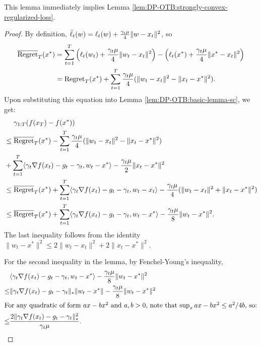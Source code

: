 This lemma immediately implies Lemma \ref{lem:DP-OTB:strongly-convex-regularized-loss}.

\LemDpotbSC*

\begin{proof}
By definition, $\bar{\ell}_t(w)=\ell_t(w) + \frac{\gamma_t\mu}{4}\|w-x_t\|^2$, so
\begin{align*}
    \overline {\mathrm{Regret}}_T(x^*) 
    &= \sum_{t=1}^T \left( \ell_t(w_t)+\frac{\gamma_t\mu}{4}\|w_t-x_t\|^2\right) - \left( \ell_t(x^*) + \frac{\gamma_t\mu}{4}\|x^*-x_t\|^2 \right) \\
    &= \mathrm{Regret}_T(x^*) + \sum_{t=1}^T \frac{\gamma_t\mu}{4}(\|w_t-x_t\|^2-\|x_t-x^*\|^2).
\end{align*}
Upon substituting this equation into Lemma \ref{lem:DP-OTB:basic-lemma-sc}, we get:
\begin{align*}
    &\quad \ \gamma_{1:T}(f(x_T) - f(x^*)) \\
    &\leq \overline{\mathrm{Regret}}_T(x^*) -\sum_{t=1}^T \frac{\gamma_t\mu}{4}(\|w_t-x_t\|^2-\|x_t-x^*\|^2) \\
    &+ \sum_{t=1}^T \langle \gamma_t \nabla f(x_t)-g_t-\gamma_t, w_t-x^*\rangle - \frac{\gamma_t\mu}{2} \|x_t-x^*\|^2 \\
    &\leq \overline{\mathrm{Regret}}_T(x^*) +\sum_{t=1}^T \langle \gamma_t\nabla f(x_t)-g_t-\gamma_t, w_t-x_t\rangle - \frac{\gamma_t\mu}{4}(\|w_t-x_t\|^2+\|x_t-x^*\|^2) \\
    &\leq \overline{\mathrm{Regret}}_T(x^*) +\sum_{t=1}^T \langle\gamma_t\nabla f(x_t)-g_t-\gamma_t, w_t-x^*\rangle - \frac{\gamma_t\mu}{8}\|w_t-x^*\|^2.
\end{align*}
The last inequality follows from the identity $\|w_t-x^*\|^2 \leq 2\|w_t-x_t\|^2 + 2\|x_t-x^*\|^2$.

For the second inequality in the lemma, by Fenchel-Young's inequality,
\begin{align*}
    &\langle\gamma_t\nabla f(x_t)-g_t-\gamma_t, w_t-x^*\rangle - \frac{\gamma_t\mu}{8}\|w_t-x^*\|^2 \\
    \leq &\|\gamma_t\nabla f(x_t)-g_t-\gamma_t\|_*\|w_t-x^*\|-\frac{\gamma_t\mu}{8}\|w_t-x^*\|^2 \\
    \intertext{For any quadratic of form $ax-bx^2$ and $a,b>0$, note that $\sup_x ax-bx^2\leq a^2/4b$, so:}
    \leq & \frac{2\|\gamma_t\nabla f(x_t)-g_t-\gamma_t\|_*^2}{\gamma_t\mu}.
\end{align*}
\end{proof}

